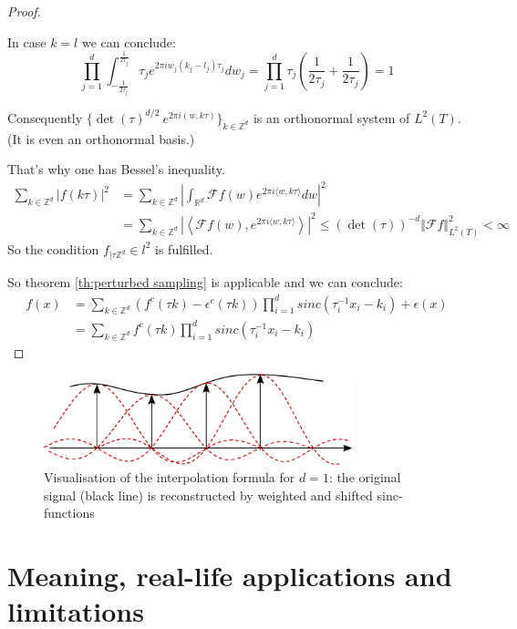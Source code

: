 \documentclass[a4paper, 11pt]{scrreprt}
\newcommand{\RR}{\mathbb{R}}
\newcommand{\ZZ}{\mathbb{Z}}
\newcommand{\FF}{\mathcal{F}}
\begin{document}
\begin{proof}[Proof]
\begin{itemize}
In case $k = l$ we can conclude:
\[\prod_{j=1}^d \int_{-\frac{1}{2\tau_j}}^{\frac{1}{2\tau_j}} \tau_j e^{2 \pi i w_j (k_j-l_j) \tau_j}dw_j
= \prod_{j=1}^d \tau_j \left(\frac{1}{2\tau_j}+\frac{1}{2\tau_j}\right) = 1\]

Consequently $\{\det(\tau)^{d/2}\ e^{2 \pi i (w,k \tau)}\}_{k \in \ZZ^d}$ is an orthonormal system of $L^2(T)$. (It is even an orthonormal basis.)

That's why one has Bessel's inequality.
\begin{align*}
\sum_{k \in \ZZ^d} |f(k \tau)|^2
&= \sum_{k \in \ZZ^d} | \int_{\RR^d} \FF f(w) e^{2 \pi i \langle w,k \tau \rangle}dw|^2 \\
&= \sum_{k \in \ZZ^d} | \left\langle \FF f(w), e^{2 \pi i \langle w,k \tau \rangle}\right\rangle |^2
\leq (\det(\tau))^{-d} \Vert \FF f \Vert_{L^2(T)}^2 < \infty
\end{align*}
So the condition $f_{|\tau\ZZ^d} \in l^2$ is fulfilled.

\end{itemize}

So theorem \ref{th:perturbed sampling} is applicable and we can conclude:
\begin{align*}
f(x) &= \sum_{k\in\ZZ^d} (f^c(\tau k)-\epsilon^c(\tau k))\prod _{i=1}^d sinc(\tau_i^{-1}x_i-k_i)+\epsilon(x) \\
&= \sum_{k \in \ZZ^d} f^c(\tau k) \prod_{i=1}^d sinc\left(\tau_i^{-1} x_i -k_i\right)  
\end{align*}

\end{proof}
\begin{figure}[htpb]
	\centering
	\includegraphics[width=0.80\textwidth]{Rekonstruktion-Visualisierung.pdf}
	\caption{Visualisation of the interpolation formula for \(d=1\): the original signal (black line) is reconstructed by weighted and shifted sinc-functions}
\end{figure}

\section{Meaning, real-life applications and limitations}
\end{document}
